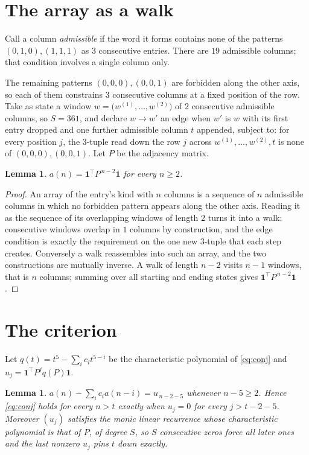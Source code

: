 \documentclass[11pt,a4paper]{article}
\theoremstyle{plain}
\newtheorem{lemma}[theorem]{Lemma}
\theoremstyle{definition}
\begin{document}
\section{The array as a walk}

Call a column \emph{admissible} if the word it forms contains none of the patterns
$(0,1,0), (1,1,1)$ as $3$ consecutive entries. There are $19$ admissible columns; that condition
involves a single column only.

The remaining patterns $(0,0,0), (0,0,1)$ are forbidden along the other axis, so each of them
constrains $3$ consecutive columns at a fixed position of the row. Take as state a
window $w=\bigl(w^{(1)},\dots,w^{(2)}\bigr)$ of $2$ consecutive admissible
columns, so $S=361$, and declare $w\to w'$ an edge when $w'$ is $w$ with its first entry
dropped and one further admissible column $t$ appended, subject to: for every position
$j$, the $3$-tuple read down the row $j$ across $w^{(1)},\dots,w^{(2)},t$
is none of $(0,0,0), (0,0,1)$. Let $P$ be the adjacency matrix.

\begin{lemma}\label{lem:walk}
$a(n)=\mathbf{1}^{\!\top}P^{\,n-2}\mathbf{1}$ for every $n\ge2$.
\end{lemma}

\begin{proof}
An array of the entry's kind with $n$ columns is a sequence of $n$ admissible columns in
which no forbidden pattern appears along the other axis. Reading it as the sequence of its
overlapping windows of length $2$ turns it into a walk: consecutive windows overlap in
$1$ columns by construction, and the edge condition is exactly the requirement on the one
new $3$-tuple that each step creates. Conversely a walk reassembles into such an array,
and the two constructions are mutually inverse. A walk of length $n-2$ visits $n-1$
windows, that is $n$ columns; summing over all starting and ending states gives
$\mathbf{1}^{\!\top}P^{\,n-2}\mathbf{1}$.
\end{proof}

\section{The criterion}

Let $q(t)=t^{5}-\sum_i c_i t^{5-i}$ be the characteristic polynomial of
\eqref{eq:conj} and $u_j=\mathbf{1}^{\!\top}P^{j}q(P)\mathbf{1}$.

\begin{lemma}\label{lem:crit}
$a(n)-\sum_i c_i a(n-i)=u_{\,n-2-5}$ whenever $n-5\ge2$. Hence
\eqref{eq:conj} holds for every $n>t$ exactly when $u_j=0$ for every
$j>t-2-5$. Moreover $(u_j)$ satisfies the monic linear recurrence whose
characteristic polynomial is that of $P$, of degree $S$, so $S$ consecutive zeros force all
later ones and the last nonzero $u_j$ pins $t$ down exactly.
\end{lemma}
\end{document}

